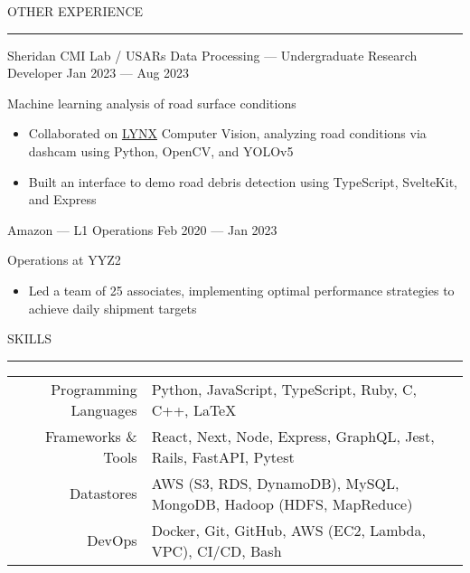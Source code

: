 \documentclass[9pt]{extarticle}
\begin{document}

\begin{adjustwidth}{4pt}{4pt} OTHER EXPERIENCE \end{adjustwidth}
\rule[8pt]{\linewidth}{0.4pt}

\begin{adjustwidth}{14pt}{14pt}
	Sheridan CMI Lab / USARs Data Processing — Undergraduate Research Developer \hfill Jan 2023 — Aug 2023
	
	Machine learning analysis of road surface conditions
	
	\begin{itemize}
		\item Collaborated on \href{https://github.com/Lynx-Data-Processing}{LYNX} Computer Vision, analyzing road conditions via dashcam using Python, OpenCV, and YOLOv5
		\item Built an interface to demo road debris detection using TypeScript, SvelteKit, and Express
	\end{itemize}
	
	Amazon — L1 Operations \hfill Feb 2020 — Jan 2023
	
	Operations at YYZ2
	
	\begin{itemize}
		\item Led a team of 25 associates, implementing optimal performance strategies to achieve daily shipment targets
	\end{itemize}
\end{adjustwidth}



\begin{adjustwidth}{4pt}{4pt} SKILLS \end{adjustwidth}
\rule[8pt]{\linewidth}{0.4pt}

\begin{adjustwidth}{14pt}{14pt}
	\begin{tabular}{ r l }
	 	Programming Languages & Python, JavaScript, TypeScript, Ruby, C, C++, \LaTeX \\ 
	 	Frameworks \& Tools & React, Next, Node, Express, GraphQL, Jest, Rails, FastAPI, Pytest \\  
	 	Datastores & AWS (S3, RDS, DynamoDB), MySQL, MongoDB, Hadoop (HDFS, MapReduce) \\  
	 	DevOps & Docker, Git, GitHub, AWS (EC2, Lambda, VPC), CI/CD, Bash \\  
	\end{tabular}
\end{adjustwidth}
\end{document}
